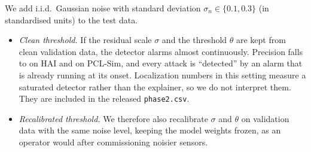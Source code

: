 We add i.i.d.\ Gaussian noise with standard deviation $\sigma_n\in\{0.1,0.3\}$ (in standardised units) to the test data.
\begin{itemize}
\item \emph{Clean threshold.} If the residual scale $\sigma$ and the threshold $\theta$ are kept from clean validation data, the detector alarms almost continuously. Precision falls to \ptwohainoiseAcleandetprecision{} on HAI and \ptwosimnoiseAcleandetprecision{} on PCL-Sim, and every attack is ``detected'' by an alarm that is already running at its onset. Localization numbers in this setting measure a saturated detector rather than the explainer, so we do not interpret them. They are included in the released \texttt{phase2.csv}.
\item \emph{Recalibrated threshold.} We therefore also recalibrate $\sigma$ and $\theta$ on validation data with the same noise level, keeping the model weights frozen, as an operator would after commissioning noisier sensors.
\end{itemize}

